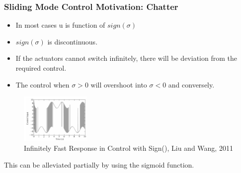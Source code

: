 \documentclass[aspectratio=169]{beamer}
\begin{document}
\begin{frame}
    \frametitle{Sliding Mode Control Motivation: Chatter}
    \begin{itemize}
        \item In most cases u is function of $sign(\sigma)$
        \item $sign(\sigma)$ is discontinuous.
        \item If the actuators cannot switch infinitely, there will be deviation from the required control.
        \item The control when $\sigma>0$ will overshoot into $\sigma<0$ and conversely.
    \end{itemize}
    \begin{figure}[htbp]
        \centering
        \includegraphics[width=0.3\textwidth]{Sliding Mode Chatter.png}
        \caption{Infinitely Fast Response in Control with Sign(), Liu and Wang, 2011 \cite{LiupingWang2009}}
    \end{figure}
    This can be alleviated partially by using the sigmoid function.
\end{frame}
\end{document}
